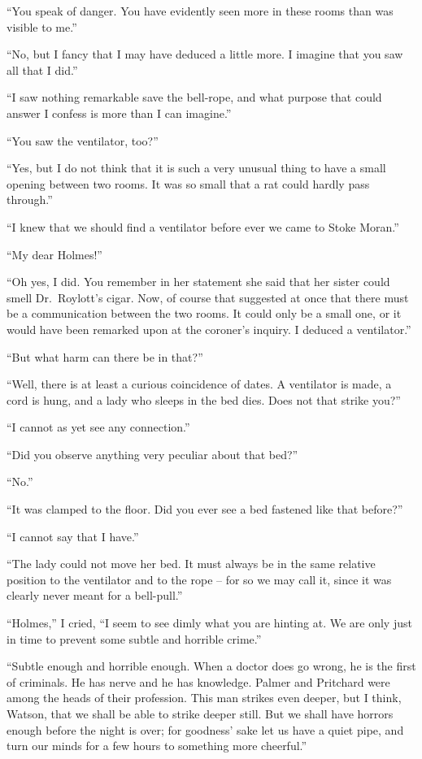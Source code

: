 “You speak of danger. You have evidently seen more in
these rooms than was visible to me.”

“No, but I fancy that I may have deduced a little more.
I imagine that you saw all that I did.”

“I saw nothing remarkable save the bell-rope, and what
purpose that could answer I confess is more than I can
imagine.”

“You saw the ventilator, too?”

“Yes, but I do not think that it is such a very unusual thing
to have a small opening between two rooms. It was so small
that a rat could hardly pass through.”

“I knew that we should find a ventilator before ever we
came to Stoke Moran.”

“My dear Holmes!”

“Oh yes, I did. You remember in her statement she said
that her sister could smell Dr.\ Roylott’s cigar. Now, of course
that suggested at once that there must be a communication
between the two rooms. It could only be a small one, or it
would have been remarked upon at the coroner’s inquiry. I
deduced a ventilator.”

“But what harm can there be in that?”

“Well, there is at least a curious coincidence of dates. A
ventilator is made, a cord is hung, and a lady who sleeps in
the bed dies. Does not that strike you?”

“I cannot as yet see any connection.”

“Did you observe anything very peculiar about that bed?”

“No.”

“It was clamped to the floor. Did you ever see a bed
fastened like that before?”

“I cannot say that I have.”

“The lady could not move her bed. It must always be in
the same relative position to the ventilator and to the rope --
for so we may call it, since it was clearly never meant for a
bell-pull.”

“Holmes,” I cried, “I seem to see dimly what you are
hinting at. We are only just in time to prevent some subtle
and horrible crime.”

“Subtle enough and horrible enough. When a doctor
does go wrong, he is the first of criminals. He has nerve
and he has knowledge. Palmer and Pritchard were among
the heads of their profession. This man strikes even deeper,
but I think, Watson, that we shall be able to strike deeper
still. But we shall have horrors enough before the night is
over; for goodness’ sake let us have a quiet pipe, and turn
our minds for a few hours to something more cheerful.”

